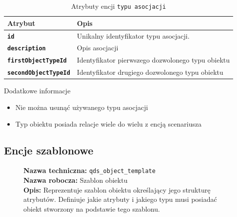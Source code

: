 \begin{table}[H]
    \centering
    \renewcommand{\arraystretch}{1.6}
    \begin{tabular}{|>{\bfseries}l|p{}|}
        \hline
        \rowcolor[HTML]{EFEFEF} \textbf{Atrybut} & \textbf{Opis} \\
        \hline
        \texttt{id} & Unikalny identyfikator typu asocjacji. \\
        \hline
        \texttt{description} & Opis asocjacji \\
        \hline
        \texttt{firstObjectTypeId} & Identyfikator pierwszego dozwolonego typu obiektu \\
        \hline
        \texttt{secondObjectTypeId} & Identyfikator drugiego dozwolonego typu obiektu \\
        \hline
    \end{tabular}
    \caption{Atrybuty encji \texttt{typu asocjacji}}
\end{table}

Dodatkowe informacje
\begin{itemize}
    \item Nie można usunąć używanego typu asocjacji
    \item Typ obiektu posiada relacje wiele do wielu z encją scenariusza
\end{itemize}

\subsection{Encje szablonowe}

\begin{figure}[H]
    \centering
    \begin{minipage}{0.8\textwidth}
        \begin{framed}
            \noindent\textbf{\large Nazwa techniczna:} \texttt{qds\_object\_template} \\
            \textbf{\large Nazwa robocza:} Szablon obiektu \\
            \textbf{\large Opis:} Reprezentuje szablon obiektu określający jego strukturę atrybutów.
            Definiuje jakie atrybuty i jakiego typu musi posiadać obiekt stworzony na podstawie tego szablonu.
        \end{framed}
    \end{minipage}
\end{figure}

